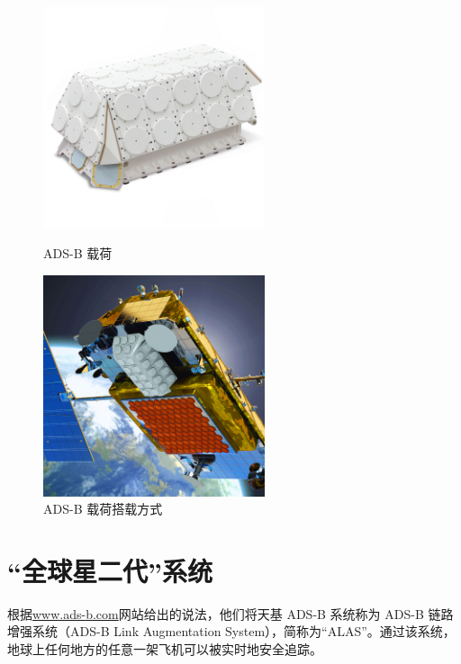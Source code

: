 \begin{figure}[htbp]
\centering
\begin{minipage}[t]{0.48\textwidth}
\centering
\includegraphics[width=6.5cm]{pic/Appstar_with_Base_2000x2000.jpg}
\caption{ADS-B 载荷}
\label{fig:Appstar_with_Base}
\end{minipage}
\begin{minipage}[t]{0.48\textwidth}
\centering
\includegraphics[width=6.5cm]{pic/reconfigurable_multimission_payloads_v2_web.jpg}
\caption{ADS-B 载荷搭载方式}
\label{fig:reconfigurable_multimission_payloads}
\end{minipage}
\end{figure}

\section{“全球星二代”系统}

根据\url{www.ads-b.com}网站给出的说法，他们将天基 ADS-B 系统称为 ADS-B 链路增强系统（ADS-B Link Augmentation System），简称为“ALAS”。通过该系统，地球上任何地方的任意一架飞机可以被实时地安全追踪。


